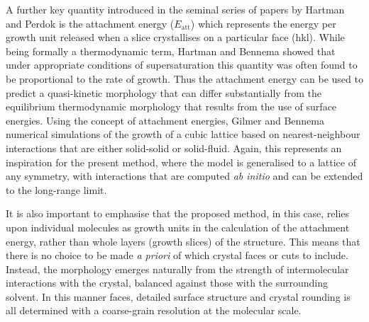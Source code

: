 \documentclass[twoside,twocolumn,9pt]{article}
\begin{document}
A further key quantity introduced in the seminal series of papers by Hartman and Perdok \cite{Hartman1955,Hartman1955-2,Hartman1955-3} is the
attachment energy ($E_\text{att}$) which represents the energy per growth unit released when a slice crystallises on a particular face (hkl). 
While being formally a thermodynamic term, Hartman and Bennema \cite{Hartman1980} showed that under appropriate conditions of supersaturation 
this quantity was often found to be proportional to the rate of growth. Thus the attachment energy can be used to predict a quasi-kinetic 
morphology that can differ substantially from the equilibrium thermodynamic morphology that results from the use of surface energies. 
Using the concept of attachment energies, Gilmer and Bennema \cite{Gilmer1972} numerical simulations of the growth of a cubic lattice 
based on nearest-neighbour interactions that are either solid-solid or solid-fluid. Again, this represents an inspiration for the 
present method, where the model is generalised to a lattice of any symmetry, with interactions that are computed \emph{ab initio} 
and can be extended to the long-range limit.

It is also important to emphasise that the proposed method, in this case, relies upon individual molecules as growth units in the calculation of the attachment energy, rather than whole layers (growth slices) of the structure. This means that there is no choice to be made \emph{a priori} of which crystal faces or cuts to include. Instead, the morphology emerges naturally from the strength of intermolecular interactions with the crystal, balanced against those with the surrounding solvent. In this manner faces, detailed surface structure and crystal rounding is all determined with a coarse-grain resolution at the molecular scale.
\end{document}
